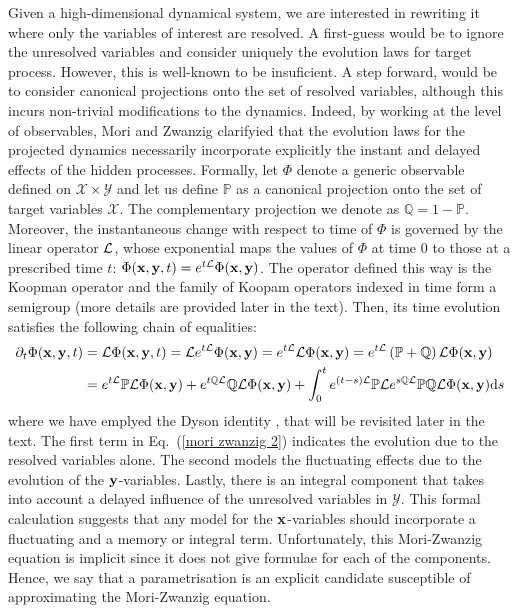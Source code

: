 \documentclass[12pt]{article}
\begin{document}
Given a high-dimensional dynamical system, we are interested in rewriting it where only the variables of interest are resolved. A first-guess would be to ignore the unresolved variables and consider uniquely the evolution laws for target process. However, this is well-known to be insuficient. A step forward, would be to consider canonical projections onto the set of resolved variables, although this incurs non-trivial modifications to the dynamics. Indeed, by working at the level of observables, Mori and Zwanzig \cite{zwanzig} clarifyied that the evolution laws for the projected dynamics necessarily incorporate explicitly the instant and delayed effects of the hidden processes. Formally, let $\Phi$ denote a generic observable defined on $\mathcal{X}\times \mathcal{Y}$ and let us define $\mathbb{P}$ as a canonical projection onto the set of target variables $\mathcal{X}$. The complementary projection we denote as $\mathbb{Q}=1 - \mathbb{P}$. Moreover, the instantaneous change with respect to time of $\Phi$ is governed by the linear operator $\mathcal{L}$, whose exponential maps the values of $\Phi$ at time $0$ to those at a prescribed time $t$: $\Phi(\mathbf{x}, \mathbf{y} , t)=e^{t\mathcal{L}}\Phi(\mathbf{x},\mathbf{y})$. The operator defined this way is the Koopman operator and the family of Koopam operators indexed in time form a semigroup (more details are provided later in the text).  Then, its time evolution satisfies the following chain of equalities:
\begin{align}
\partial _t \Phi(\mathbf{x},\mathbf{y} , t) &= \mathcal{L} \Phi(\mathbf{x},\mathbf{y} , t) = \mathcal{L} e^{t\mathcal{L}}\Phi(\mathbf{x},\mathbf{y})= e^{t\mathcal{L}}\mathcal{L}\Phi(\mathbf{x},\mathbf{y})= e^{t\mathcal{L}}\left(\mathbb{P}+\mathbb{Q}\right)\mathcal{L}\Phi(\mathbf{x},\mathbf{y}) \\ \label{mori zwanzig 2} &= e^{t\mathcal{L}}\mathbb{P}\mathcal{L}\Phi(\mathbf{x},\mathbf{y}) + e^{t\mathbb{Q}\mathcal{L}}\mathbb{Q}\mathcal{L}\Phi(\mathbf{x},\mathbf{y}) + \int_{0}^{t}e^{(t-s)\mathcal{L}}\mathbb{P}\mathcal{L} e^{s\mathbb{Q}\mathcal{L}}\mathbb{P}\mathbb{Q}\mathcal{L} \Phi(\mathbf{x},\mathbf{y}) \mathrm{d} s
\end{align}
where we have emplyed the Dyson identity \cite{engelsemigroups2006}, that will be revisited later in the text. The first term in Eq.~(\ref{mori zwanzig 2}) indicates the evolution due to the resolved variables alone. The second models the fluctuating effects due to the evolution of the  $\mathbf{y}$-variables. Lastly, there is an integral component that takes into account a delayed influence of the unresolved variables in $\mathcal{Y}$. This formal calculation suggests that any model for the $\mathbf{x}$-variables should incorporate a fluctuating and a memory or integral term. Unfortunately, this Mori-Zwanzig equation is implicit since it does not give formulae for each of the components. Hence, we say that a parametrisation is an explicit candidate susceptible of approximating the Mori-Zwanzig equation.
\end{document}
